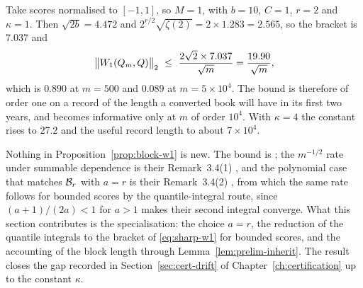 \documentclass[../../../main.tex]{subfiles}
\begin{document}
\begin{example}\label{ex:sharp-w1-size}
Take scores normalised to $[-1,1]$, so $M=1$, with $b=10$, $C=1$, $r=2$ and $\kappa=1$. Then $\sqrt{2b}=4.472$ and $2^{r/2}\sqrt{\zeta(2)}=2\times1.283=2.565$, so the bracket is $7.037$ and
\[
\big\|\Wone(Q_m,Q)\big\|_2\ \le\ \frac{2\sqrt2\times7.037}{\sqrt m}=\frac{19.90}{\sqrt m},
\]
which is $0.890$ at $m=500$ and $0.089$ at $m=5\times10^4$. The bound is therefore of order one on a record of the length a converted book will have in its first two years, and becomes informative only at $m$ of order $10^4$. With $\kappa=4$ the constant rises to $27.2$ and the useful record length to about $7\times10^4$.
\end{example}


\begin{remark}[Attribution]\label{rem:sharp-w1-attrib}
Nothing in Proposition~\ref{prop:block-w1} is new. The bound is \citep[Prop.~3.2, eq.~(3.8)]{dedecker2017}; the $m^{-1/2}$ rate under summable dependence is their Remark~3.4(1) \citep[Remark~3.4(1)]{dedecker2017}, and the polynomial case that matches $\mathcal B_{r}$ with $a=r$ is their Remark~3.4(2) \citep[Remark~3.4(2), eq.~(3.12)]{dedecker2017}, from which the same rate follows for bounded scores by the quantile-integral route, since $(a+1)/(2a)<1$ for $a>1$ makes their second integral converge. What this section contributes is the specialisation: the choice $a=r$, the reduction of the quantile integrals to the bracket of \eqref{eq:sharp-w1} for bounded scores, and the accounting of the block length through Lemma~\ref{lem:prelim-inherit}. The result closes the gap recorded in Section~\ref{sec:cert-drift} of Chapter~\ref{ch:certification} up to the constant $\kappa$.
\end{remark}

\end{document}
